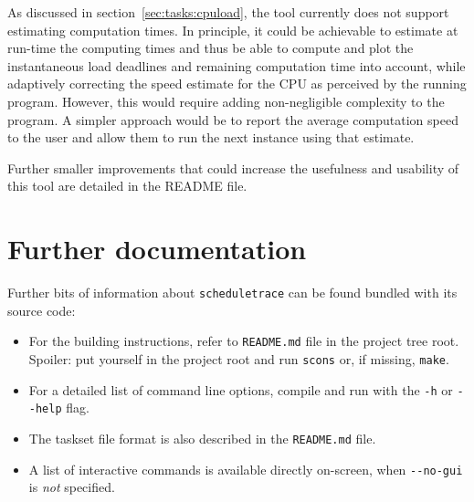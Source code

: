 \documentclass[paper=a4, fontsize=11pt]{scrartcl}
\newcommand{\mono}[1]{\texttt{#1}}
\numberwithin{equation}{section}        %
\numberwithin{figure}{section}          %
\numberwithin{table}{section}               %
\numberwithin{fragment}{section}
\begin{document}
As discussed in section~\ref{sec:tasks:cpuload}, the tool currently does not support estimating computation times. In principle, it could be achievable to estimate at run-time the computing times and thus be able to compute and plot the instantaneous load deadlines and remaining computation time into account, while adaptively correcting the speed estimate for the CPU as perceived by the running program. However, this would require adding non-negligible complexity to the program. A simpler approach would be to report the average computation speed to the user and allow them to run the next instance using that estimate.

Further smaller improvements that could increase the usefulness and usability of this tool are detailed in the README file.


\section*{Further documentation}
\label{sec:docs}

Further bits of information about \mono{scheduletrace} can be found bundled with its source code:

\begin{itemize}
\item For the building instructions, refer to \mono{README.md} file in the project tree root. Spoiler: put yourself in the project root and run \mono{scons} or, if missing, \mono{make}.
\item For a detailed list of command line options, compile and run with the \mono{-h} or \mono{-{}-help} flag.
\item The taskset file format is also described in the \mono{README.md} file.
\item A list of interactive commands is available directly on-screen, when \mono{-{}-no-gui} is \textit{not} specified.
\end{itemize}

\end{document}
